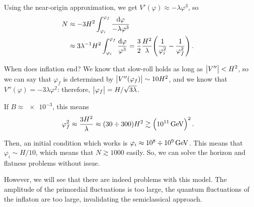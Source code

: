 \documentclass[main.tex]{subfiles}
\begin{document}
Using the near-origin approximation, we get \(V'(\varphi ) \approx - \lambda \varphi^3\), so 
%
\begin{align}
N &\approx  - 3 H^2 \int_{\varphi _i}^{\varphi _f} \frac{ \dd{\varphi }}{- \lambda \varphi^3}   \\
&\approx 3 \lambda^{-1} H^2 \int_{\varphi _i}^{\varphi _f} \frac{ \dd{\varphi }}{\varphi^3} = \frac{3}{2} \frac{H^2}{\lambda } \qty( \frac{1}{\varphi _i^2} - \frac{1}{\varphi_f^2})
\,.
\end{align}

When does inflation end?
We know that slow-roll holds as long as \(\abs{V''} < H^2\), so we can say that \(\varphi _f\) is determined by \(\abs{V''(\varphi _f)} \sim 10 H^2\), and we know that \(V''(\varphi ) = - 3 \lambda \varphi^2\): 
therefore, \(\abs{\varphi _f} = H / \sqrt{3 \lambda }\). 

If \(B \approx \num{e-3}\), this means 
%
\begin{align}
\varphi _f^2 \approx \frac{3 H^2}{\lambda } \approx \qty(30 \divisionsymbol 300) H^2 \gtrsim \qty(\SI{e11}{GeV})^2
\,.
\end{align}

Then, an initial condition which works is \(\varphi _i \approx \num{e8} \divisionsymbol \SI{e9}{GeV}\). 
This means that \(\varphi _i \sim H / 10\), which means that \(N \gtrsim 1000\) easily.
So, we can solve the horizon and flatness problems without issue. 

However, we will see that there are indeed problems with this model. 
The amplitude of the primordial fluctuations is too large, the quantum fluctuations of the inflaton are too large, invalidating the semiclassical approach. 
\end{document}
